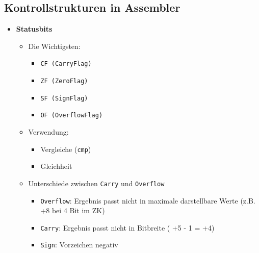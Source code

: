 \subsection{Kontrollstrukturen in Assembler}
    \begin{itemize}
        \item \textbf{Statusbits}
            \begin{itemize}
                \item Die Wichtigsten:
                    \begin{itemize}
                        \item \texttt{CF (CarryFlag)}
                        \item \texttt{ZF (ZeroFlag)}
                        \item \texttt{SF (SignFlag)}
                        \item \texttt{OF (OverflowFlag)}
                    \end{itemize}
                \item Verwendung:
                    \begin{itemize}
                        \item Vergleiche (\texttt{cmp})
                        \item Gleichheit
                    \end{itemize}
                \item Unterschiede zwischen \texttt{Carry} und \texttt{Overflow}
                    \begin{itemize}
                        \item \texttt{Overflow}: Ergebnis passt nicht in maximale darstellbare Werte (z.B. +8 bei 4 Bit im ZK)
                        \item \texttt{Carry}: Ergebnis passt nicht in Bitbreite ( +5 - 1 = +4)
                        \item \texttt{Sign}: Vorzeichen negativ
                    \end{itemize}
            \end{itemize}
        

\end{itemize}
